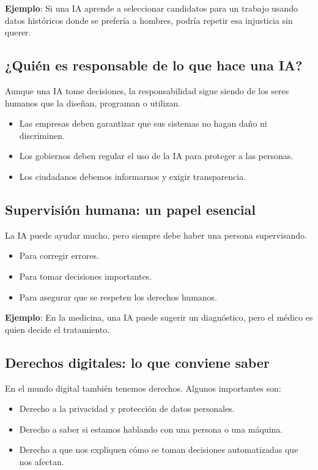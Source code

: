 \documentclass[12pt]{article}
\begin{document}
	\textbf{Ejemplo}: Si una IA aprende a seleccionar candidatos para un trabajo usando datos históricos donde se prefería a hombres, podría repetir esa injusticia sin querer.
	
	\subsection*{¿Quién es responsable de lo que hace una IA?}
	Aunque una IA tome decisiones, la responsabilidad sigue siendo de los seres humanos que la diseñan, programan o utilizan.
	\begin{itemize}
		\item Las empresas deben garantizar que sus sistemas no hagan daño ni discriminen.
		\item Los gobiernos deben regular el uso de la IA para proteger a las personas.
		\item Los ciudadanos debemos informarnos y exigir transparencia.
	\end{itemize}
	
	\subsection*{Supervisión humana: un papel esencial}
	La IA puede ayudar mucho, pero siempre debe haber una persona supervisando.
	\begin{itemize}
		\item Para corregir errores.
		\item Para tomar decisiones importantes.
		\item Para asegurar que se respeten los derechos humanos.
	\end{itemize}
	
	\textbf{Ejemplo}: En la medicina, una IA puede sugerir un diagnóstico, pero el médico es quien decide el tratamiento.
	
	\subsection*{Derechos digitales: lo que conviene saber}
	En el mundo digital también tenemos derechos. Algunos importantes son:
	\begin{itemize}
		\item Derecho a la privacidad y protección de datos personales.
		\item Derecho a saber si estamos hablando con una persona o una máquina.
		\item Derecho a que nos expliquen cómo se toman decisiones automatizadas que nos afectan.
	\end{itemize}
	
\end{document}
